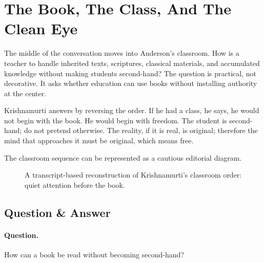 \section{The Book, The Class, And The Clean Eye}

The middle of the conversation moves into Anderson's classroom. How is a teacher to handle inherited texts, scriptures, classical materials, and accumulated knowledge without making students second-hand? The question is practical, not decorative. It asks whether education can use books without installing authority at the center.

Krishnamurti answers by reversing the order. If he had a class, he says, he would not begin with the book. He would begin with freedom. The student is second-hand; do not pretend otherwise. The reality, if it is real, is original; therefore the mind that approaches it must be original, which means free.

The classroom sequence can be represented as a cautious editorial diagram.

\begin{figure}
\centering
{}
\caption{A transcript-based reconstruction of Krishnamurti's classroom order: quiet attention before the book.}
\end{figure}

\subsection{Question \& Answer}

\paragraph{Question.}
How can a book be read without becoming second-hand?

